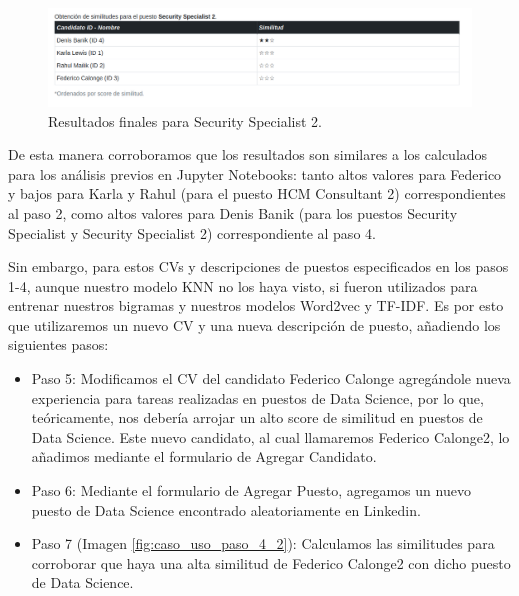 \documentclass[12pt,a4paper]{article}
\begin{document}
\begin{sloppypar}
\begin{figure}[H]    %
 \centering
 \includegraphics[width=1\textwidth]{images/implementacion_web/caso_uso_paso_4_1.png}
 \caption{Resultados finales para Security Specialist 2.} 
 \label{fig:caso_uso_paso_4_1}
\end{figure}

De esta manera corroboramos que los resultados son similares a los calculados para los análisis previos en Jupyter Notebooks: tanto altos valores para Federico y bajos para Karla y Rahul (para el puesto HCM Consultant 2) correspondientes al paso 2, como altos valores para Denis Banik (para los puestos Security Specialist y Security Specialist 2) correspondiente al paso 4.

Sin embargo, para estos CVs y descripciones de puestos especificados en los pasos 1-4, aunque nuestro modelo KNN no los haya visto, si fueron utilizados para entrenar nuestros bigramas y nuestros modelos Word2vec y TF-IDF. Es por esto que utilizaremos un nuevo CV y una nueva descripción de puesto, añadiendo los siguientes pasos:

\begin{itemize}

\item Paso 5: Modificamos el CV del candidato Federico Calonge agregándole nueva experiencia para tareas realizadas en puestos de Data Science, por lo que, teóricamente, nos debería arrojar un alto score de similitud en puestos de Data Science. Este nuevo candidato, al cual llamaremos Federico Calonge2, lo añadimos mediante el formulario de Agregar Candidato.

\item Paso 6: Mediante el formulario de Agregar Puesto, agregamos un nuevo puesto de Data Science encontrado aleatoriamente en Linkedin.

\item Paso 7 (Imagen \ref{fig:caso_uso_paso_4_2}): Calculamos las similitudes para corroborar que haya una alta similitud de Federico Calonge2 con dicho puesto de Data Science.

\end{itemize}


\end{sloppypar}
\end{document}
